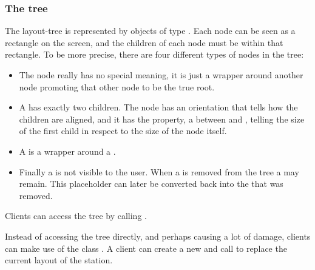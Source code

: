\subsubsection{The tree}
The layout-tree is represented by objects of type . Each node can be seen as a rectangle on the screen, and the children of each node must be within that rectangle. To be more precise, there are four different types of nodes in the tree:

\begin{itemize}
 \item The  node really has no special meaning, it is just a wrapper around another node promoting that other node to be the true root.
 \item A  has exactly two children. The node has an orientation that tells how the children are aligned, and it has the  property, a  between  and , telling the size of the first child in respect to the size of the node itself.
 \item A  is a wrapper around a .
 \item Finally a  is not visible to the user. When a  is removed from the tree a  may remain. This placeholder can later be converted back into the  that was removed.
\end{itemize}
Clients can access the tree by calling .


Instead of accessing the tree directly, and perhaps causing a lot of damage, clients can make use of the class . A client can create a new  and call  to replace the current layout of the station.


